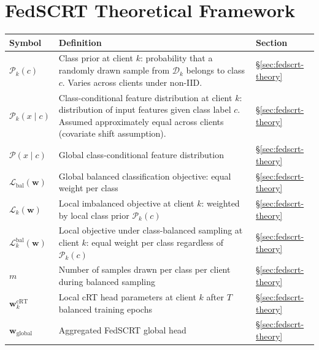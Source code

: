 \section*{FedSCRT Theoretical Framework}
\begin{center}
\renewcommand{\arraystretch}{1.4}
\begin{tabular}{p{2.8cm} p{9.5cm} p{1.6cm}}
  \hline
  \textbf{Symbol} & \textbf{Definition} & \textbf{Section} \\
  \hline
  $\mathcal{P}_k(c)$
    & Class prior at client $k$: probability that a
      randomly drawn sample from $\mathcal{D}_k$ belongs
      to class $c$. Varies across clients under non-IID.
    & §\ref{sec:fedscrt-theory} \\
  $\mathcal{P}_k(x \mid c)$
    & Class-conditional feature distribution at client $k$:
      distribution of input features given class label $c$.
      Assumed approximately equal across clients (covariate
      shift assumption).
    & §\ref{sec:fedscrt-theory} \\
  $\mathcal{P}(x \mid c)$
    & Global class-conditional feature distribution
    & §\ref{sec:fedscrt-theory} \\
  $\mathcal{L}_{\mathrm{bal}}(\mathbf{w})$
    & Global balanced classification objective:
      equal weight per class
    & §\ref{sec:fedscrt-theory} \\
  $\mathcal{L}_k(\mathbf{w})$
    & Local imbalanced objective at client $k$:
      weighted by local class prior $\mathcal{P}_k(c)$
    & §\ref{sec:fedscrt-theory} \\
  $\mathcal{L}_k^{\mathrm{bal}}(\mathbf{w})$
    & Local objective under class-balanced sampling
      at client $k$: equal weight per class regardless
      of $\mathcal{P}_k(c)$
    & §\ref{sec:fedscrt-theory} \\
  $m$
    & Number of samples drawn per class per client
      during balanced sampling
    & §\ref{sec:fedscrt-theory} \\
  $\mathbf{w}_k^{\mathrm{cRT}}$
    & Local cRT head parameters at client $k$ after
      $T$ balanced training epochs
    & §\ref{sec:fedscrt-theory} \\
  $\mathbf{w}_{\mathrm{global}}$
    & Aggregated FedSCRT global head
    & §\ref{sec:fedscrt-theory} \\
  \hline
\end{tabular}
\end{center}


